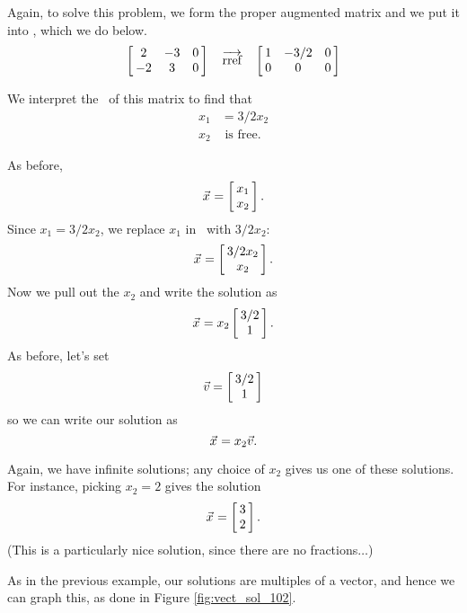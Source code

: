 {Again, to solve this problem, we form the proper augmented matrix and we put it into \rref, which we do below. $$\bmx{ccc} 2&-3&0\\-2 & 3&0\emx \quad \arref \quad \bmx{ccc} 1 & -3/2 & 0 \\0&0&0\emx$$

We interpret the \rref\ of this matrix to find that \begin{align*} x_1 &= 3/2x_2 \\ x_2 &\text{ is free.} \end{align*}

As before, $$\vx = \bmx{c} x_1\\x_2\emx.$$ Since $x_1 = 3/2x_2$, we replace $x_1$ in \vx\ with $3/2x_2$: $$\vx = \bmx{c} 3/2x_2\\x_2\emx.$$ Now we pull out the $x_2$ and write the solution as $$\vx = x_2\bmx{c}3/2\\1\emx.$$ As before, let's set $$\vv = \bmx{c} 3/2\\1\emx$$ so we can write our solution as $$\vx = x_2\vv.$$


Again, we have infinite solutions; any choice of $x_2$ gives us one of these solutions. For instance, picking $x_2=2$ gives the solution $$\vx = \bmx{c} 3\\2\emx.$$ (This is a particularly nice solution, since there are no fractions$\ldots$) 

As in the previous example, our solutions are multiples of a vector, and hence we can graph this, as done in Figure \ref{fig:vect_sol_102}.

\begin{myfigure}%
\begin{center}
\end{center}
\label{fig:vect_sol_102}
\end{myfigure}
}\\

